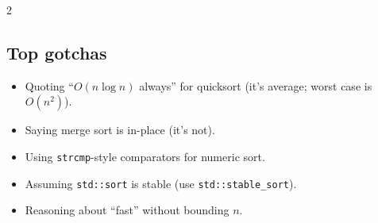 \documentclass[10pt]{article}
\begin{document}
\begin{multicols}{2}
\subsection*{Top gotchas}
\begin{itemize}
    \item Quoting ``$O(n \log n)$ always'' for quicksort (it's average;
    worst case is $O(n^2)$).
    \item Saying merge sort is in-place (it's not).
    \item Using \texttt{strcmp}-style comparators for numeric sort.
    \item Assuming \texttt{std::sort} is stable (use
    \texttt{std::stable\_sort}).
    \item Reasoning about ``fast'' without bounding $n$.
\end{itemize}

\end{multicols}
\end{document}
